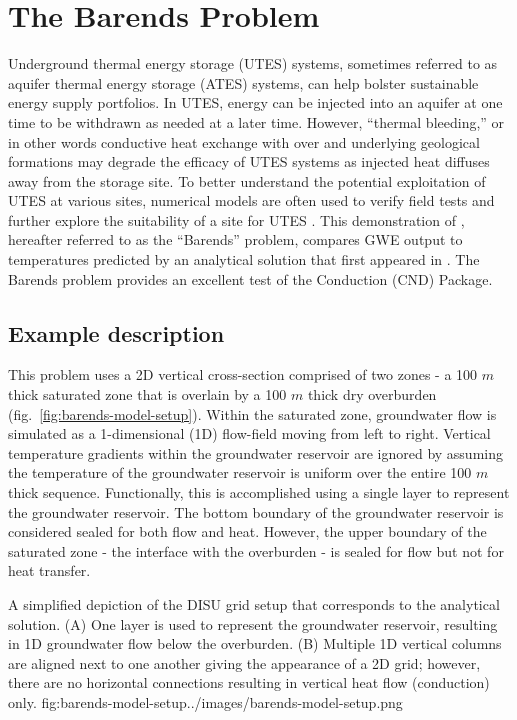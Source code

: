 \section{The Barends Problem}

Underground thermal energy storage (UTES) systems, sometimes referred to as aquifer thermal energy storage (ATES) systems, can help bolster sustainable energy supply portfolios. In UTES, energy can be injected into an aquifer at one time to be withdrawn as needed at a later time.  However, ``thermal bleeding,'' or in other words conductive heat exchange with over and underlying geological formations may degrade the efficacy of UTES systems as injected heat diffuses away from the storage site.  To better understand the potential exploitation of UTES at various sites, numerical models are often used to verify field tests and further explore the suitability of a site for UTES \citep{barends2010}.  This demonstration of \mf, hereafter referred to as the ``Barends'' problem, compares \mf GWE output to temperatures predicted by an analytical solution that first appeared in \cite{barends2010}.  The Barends problem provides an excellent test of the Conduction (CND) Package.

\subsection{Example description}

This problem uses a 2D vertical cross-section comprised of two zones - a 100 $m$ thick saturated zone that is overlain by a 100 $m$ thick dry overburden (fig.~\ref{fig:barends-model-setup}). Within the saturated zone, groundwater flow is simulated as a 1-dimensional (1D) flow-field moving from left to right.  Vertical temperature gradients within the groundwater reservoir are ignored by assuming the temperature of the groundwater reservoir is uniform over the entire 100 $m$ thick sequence.  Functionally, this is accomplished using a single layer to represent the groundwater reservoir.  The bottom boundary of the groundwater reservoir is considered sealed for both flow and heat.  However, the upper boundary of the saturated zone - the interface with the overburden - is sealed for flow but not for heat transfer.  

\begin{StandardFigure}{
    A simplified depiction of the DISU grid \citep{modflow6gwf} setup that corresponds to the \cite{barends2010} analytical solution. (A) One layer is used to represent the groundwater reservoir, resulting in 1D groundwater flow below the overburden. (B) Multiple 1D vertical columns are aligned next to one another giving the appearance of a 2D grid; however, there are no horizontal connections resulting in vertical heat flow (conduction) only.}
    {fig:barends-model-setup}{../images/barends-model-setup.png}
\end{StandardFigure}

